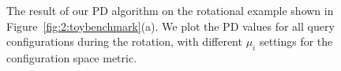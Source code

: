 \begin{figure}[!h]
\caption[Configuration space metric's influence on the result of our PD algorithm: rotational example]{
The result of our PD algorithm on the rotational example shown in Figure~\ref{fig:2:toybenchmark}(a). We plot the PD values for all query configurations during the rotation, with different $\mu_i$ settings for the configuration space metric.
}\label{fig:2:rotation_error}
\end{figure}



